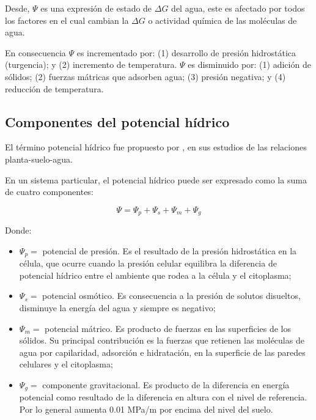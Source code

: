 Desde, $\Psi$ es una expresi\'on de estado de $\Delta G$ del agua, este es afectado por todos los factores en el cual cambian la $\Delta G$ o actividad qu\'imica de las mol\'eculas de agua. 

En consecuencia $\Psi$ es incrementado por: (1) desarrollo de presi\'on hidrost\'atica (turgencia); y (2) incremento de temperatura. $\Psi$ es disminuido por: (1) adici\'on de s\'olidos; (2) fuerzas m\'atricas que adsorben agua; (3) presi\'on negativa; y (4) reducci\'on de temperatura.

\subsection{Componentes del potencial h\'idrico}

El t\'ermino potencial h\'idrico fue propuesto por \citet{slatyer1960terminology}, en sus estudios de las relaciones planta-suelo-agua. 

En un sistema particular, el potencial h\'idrico puede ser expresado como la suma de cuatro componentes:

$$\Psi = \Psi_p + \Psi_s + \Psi_m + \Psi_g$$

Donde:

\begin{itemize}
	\item  $\Psi_p = $ potencial de presi\'on. Es el resultado de la presi\'on hidrost\'atica en la c\'elula, que ocurre cuando la presi\'on celular equilibra la diferencia de potencial hídrico entre el ambiente que rodea a la célula y el citoplasma;
	
	\item $\Psi_s = $ potencial osm\'otico. Es consecuencia a la presi\'on de solutos disueltos, disminuye la energ\'ia del agua y siempre es negativo;
	
	\item $\Psi_m = $ potencial m\'atrico. Es producto de fuerzas en las superficies de los s\'olidos. Su principal contribuci\'on es la fuerzas que retienen las mol\'eculas de agua por capilaridad, adsorci\'on e hidrataci\'on, en la superficie de las paredes celulares y el citoplasma;
	
	\item $\Psi_g = $ componente gravitacional. Es producto de la diferencia en energ\'ia potencial como resultado de la diferencia en altura con el nivel de referencia. Por lo general aumenta 0.01 MPa/m por encima del nivel del suelo. 
\end{itemize}

